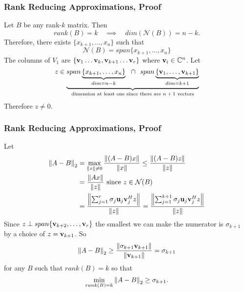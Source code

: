 \documentclass{beamer}
\begin{document}
\begin{frame}\frametitle{Rank Reducing Approximations, Proof}
	Let $B$ be any rank-$k$ matrix.  Then 
	\[
		rank(B)=k \quad \implies \quad dim(\mathcal{N}(B))=n-k.
	\]
	Therefore, there exists $ \{x_{k+1},\ldots,x_n\} $ such that
	\[ 
		\mathcal{N}(B) = span\{x_{k+1}, \ldots, x_n \}
	\]
	The columns of $V_1$ are $\{\mathbf{v}_1\ldots \mathbf{v}_k,\mathbf{v}_{k+1}\ldots \mathbf{v}_r\}$ where $\mathbf{v}_i \in \mathbb{C}^n$.
	Let 
	\[
		z \in 
			\underbrace{
				span\underbrace{
						\{x_{k+1},\ldots,x_n\}
					}_{dim=n-k} 
					~~\cap~~ 
				span\underbrace{
						\{\mathbf{v}_1,\ldots,\mathbf{v}_{k+1}\}
					}_{dim=k+1}
			}_{\text{dimension at least one since there are $n+1$ vectors}
			} 
	\]
	Therefore $z \neq 0$.
\end{frame}

\begin{frame}\frametitle{Rank Reducing Approximations, Proof}
	Let 
	\begin{align*}
		\left\|A-B \right\|_2 
			&= \max_{\left\|x \right\|\neq 0}\frac{\left\|(A-B)x \right\|}{\left\|x \right\|} \leq \frac{\left\|(A-B)z \right\|}{\left\|z \right\|} \\
			&= \frac{\left\|Ax \right\|}{\left\|z \right\|} \text{ since } z \in \mathcal{N}(B) \\
			&= \frac{\left\|\sum_{j=1}^r\sigma_j\mathbf{u}_j\mathbf{v}_j^Hz \right\|}{\left\|z \right\|} = \frac{\left\|\sum_{j=1}^{k+1}\sigma_j\mathbf{u}_j\mathbf{v}_j^Hz \right\|}{\left\|z \right\|}
	\end{align*}	
	Since $z \perp span\{\mathbf{v}_{k+2},\ldots,\mathbf{v}_r\}$ the smallest we can make the numerator is $\sigma_{k+1}$ by a choice of $z = \mathbf{v}_{k+1}$.  So
	\[ 
		\left\|A-B \right\|_2 
			\geq \frac{\left\|\sigma_{k+1 }\mathbf{v}_{k+1}\right\|}{\left\|\mathbf{v}_{k+1} \right\|} 
			= \sigma_{k+1} 
	\]
	for any $B$ such that $rank(B) = k$ so that
	\[ 
		\min_{rank(B) = k}\left\|A-B \right\|_2 \geq \sigma_{k+1}.
	\]
\end{frame}
\end{document}
